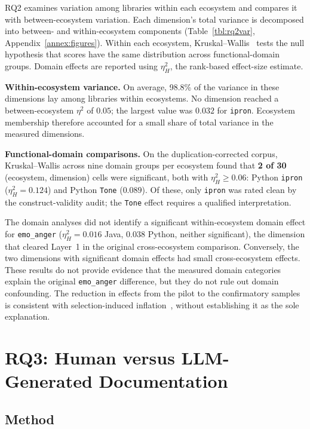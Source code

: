 \documentclass[conference]{IEEEtran}
\begin{document}
RQ2 examines variation among libraries within each ecosystem and compares it with between-ecosystem variation. Each dimension's total variance is decomposed into between- and within-ecosystem components (Table~\ref{tbl:rq2var}, Appendix~\ref{annex:figures}). Within each ecosystem, Kruskal--Wallis~\cite{kruskal1952} tests the null hypothesis that scores have the same distribution across functional-domain groups. Domain effects are reported using $\eta^2_H$, the rank-based effect-size estimate.

\textbf{Within-ecosystem variance.} On average, 98.8\% of the variance in these dimensions lay among libraries within ecosystems. No dimension reached a between-ecosystem $\eta^2$ of $0.05$; the largest value was $0.032$ for \texttt{ipron}. Ecosystem membership therefore accounted for a small share of total variance in the measured dimensions.

\textbf{Functional-domain comparisons.} On the duplication-corrected corpus, Kruskal--Wallis across nine domain groups per ecosystem found that \textbf{2 of 30} (ecosystem, dimension) cells were significant, both with $\eta^2_H \ge 0.06$: Python \texttt{ipron} ($\eta^2_H = 0.124$) and Python \texttt{Tone} ($0.089$). Of these, only \texttt{ipron} was rated clean by the construct-validity audit; the \texttt{Tone} effect requires a qualified interpretation.

The domain analyses did not identify a significant within-ecosystem domain effect for \texttt{emo\_anger} ($\eta^2_H = 0.016$ Java, $0.038$ Python, neither significant), the dimension that cleared Layer~1 in the original cross-ecosystem comparison. Conversely, the two dimensions with significant domain effects had small cross-ecosystem effects. These results do not provide evidence that the measured domain categories explain the original \texttt{emo\_anger} difference, but they do not rule out domain confounding. The reduction in effects from the pilot to the confirmatory samples is consistent with selection-induced inflation~\cite{button2013}, without establishing it as the sole explanation.

\section{RQ3: Human versus LLM-Generated Documentation}
\label{sec:rq3}

\subsection{Method}
\end{document}
